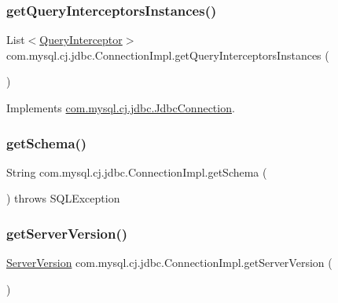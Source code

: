 \subsubsection{\texorpdfstring{get\+Query\+Interceptors\+Instances()}{getQueryInterceptorsInstances()}}
{\footnotesize\ttfamily List$<$\mbox{\hyperlink{interfacecom_1_1mysql_1_1cj_1_1interceptors_1_1_query_interceptor}{Query\+Interceptor}}$>$ com.\+mysql.\+cj.\+jdbc.\+Connection\+Impl.\+get\+Query\+Interceptors\+Instances (\begin{DoxyParamCaption}{ }\end{DoxyParamCaption})}



Implements \mbox{\hyperlink{interfacecom_1_1mysql_1_1cj_1_1jdbc_1_1_jdbc_connection_a06e9e0a4a916223a7b1582f10b8fdb5d}{com.\+mysql.\+cj.\+jdbc.\+Jdbc\+Connection}}.

\mbox{\label{classcom_1_1mysql_1_1cj_1_1jdbc_1_1_connection_impl_a865461cff23a3d175ea3f27d01a60940}} 
\subsubsection{\texorpdfstring{get\+Schema()}{getSchema()}}
{\footnotesize\ttfamily String com.\+mysql.\+cj.\+jdbc.\+Connection\+Impl.\+get\+Schema (\begin{DoxyParamCaption}{ }\end{DoxyParamCaption}) throws S\+Q\+L\+Exception}

\mbox{\label{classcom_1_1mysql_1_1cj_1_1jdbc_1_1_connection_impl_a9267b762c7ea6995bef16e7fa28a8eaf}} 
\subsubsection{\texorpdfstring{get\+Server\+Version()}{getServerVersion()}}
{\footnotesize\ttfamily \mbox{\hyperlink{classcom_1_1mysql_1_1cj_1_1_server_version}{Server\+Version}} com.\+mysql.\+cj.\+jdbc.\+Connection\+Impl.\+get\+Server\+Version (\begin{DoxyParamCaption}{ }\end{DoxyParamCaption})}



